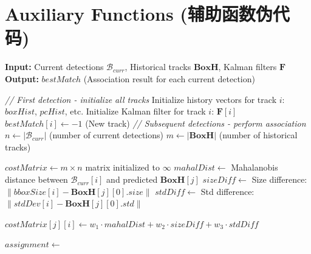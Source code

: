 \documentclass[14pt,a4paper]{article}
\begin{document}
\newpage


\section*{Auxiliary Functions (辅助函数伪代码)}

\begin{algorithm}
\caption{BoxAssociation - Data Association using Hungarian Algorithm}
\begin{algorithmic}[1]

\State \textbf{Input:} Current detections $\mathcal{B}_{curr}$, Historical tracks $\mathbf{BoxH}$, Kalman filters $\mathbf{F}$
\State \textbf{Output:} $bestMatch$ (Association result for each current detection)

    \State \textit{// First detection - initialize all tracks}
        \State Initialize history vectors for track $i$: $boxHist$, $pcHist$, etc.
        \State Initialize Kalman filter for track $i$: $\mathbf{F}[i]$
        \State $bestMatch[i] \gets -1$ (New track)
    \EndFor
\Else
    \State \textit{// Subsequent detections - perform association}
    \State $n \gets |\mathcal{B}_{curr}|$ (number of current detections)
    \State $m \gets |\mathbf{BoxH}|$ (number of historical tracks)
    
        \State {}
    \EndFor
    
    \State $costMatrix \gets m \times n$ matrix initialized to $\infty$
            \State $mahalDist \gets$ Mahalanobis distance between $\mathcal{B}_{curr}[i]$ and predicted $\mathbf{BoxH}[j]$
            \State $sizeDiff \gets$ Size difference: $\| bboxSize[i] - \mathbf{BoxH}[j][0].size \|$
            \State $stdDiff \gets$ Std difference: $\| stdDev[i] - \mathbf{BoxH}[j][0].std \|$
            
            \State $costMatrix[j][i] \gets w_1 \cdot mahalDist + w_2 \cdot sizeDiff + w_3 \cdot stdDiff$
        \EndFor
    \EndFor
    
    \State $assignment \gets$ 
    

\end{algorithmic}
\end{algorithm}
\end{document}
